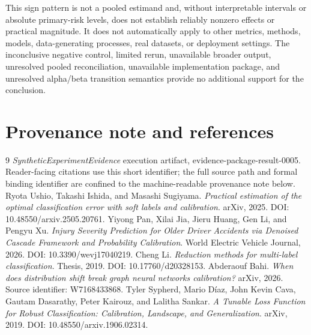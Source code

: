 \documentclass{article}
\begin{document}
This sign pattern is not a pooled estimand and, without interpretable intervals or absolute primary-risk levels, does not establish reliably nonzero effects or practical magnitude. It does not automatically apply to other metrics, methods, models, data-generating processes, real datasets, or deployment settings. The inconclusive negative control, limited rerun, unavailable broader output, unresolved pooled reconciliation, unavailable implementation package, and unresolved alpha/beta transition semantics provide no additional support for the conclusion.

\section*{Provenance note and references}
\begin{thebibliography}{9}
 \emph{SyntheticExperimentEvidence} execution artifact, evidence-package-result-0005. Reader-facing citations use this short identifier; the full source path and formal binding identifier are confined to the machine-readable provenance note below.
 Ryota Ushio, Takashi Ishida, and Masashi Sugiyama. \emph{Practical estimation of the optimal classification error with soft labels and calibration}. arXiv, 2025. DOI: 10.48550/arxiv.2505.20761.
 Yiyong Pan, Xilai Jia, Jieru Huang, Gen Li, and Pengyu Xu. \emph{Injury Severity Prediction for Older Driver Accidents via Denoised Cascade Framework and Probability Calibration}. World Electric Vehicle Journal, 2026. DOI: 10.3390/wevj17040219.
 Cheng Li. \emph{Reduction methods for multi-label classification}. Thesis, 2019. DOI: 10.17760/d20328153.
 Abderaouf Bahi. \emph{When does distribution shift break graph neural networks calibration?} arXiv, 2026. Source identifier: W7168433868.
 Tyler Sypherd, Mario D{\'i}az, John Kevin Cava, Gautam Dasarathy, Peter Kairouz, and Lalitha Sankar. \emph{A Tunable Loss Function for Robust Classification: Calibration, Landscape, and Generalization}. arXiv, 2019. DOI: 10.48550/arxiv.1906.02314.
\end{thebibliography}
\end{document}
